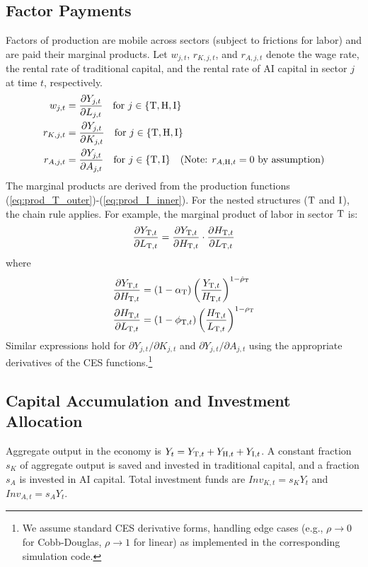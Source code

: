 \documentclass{article}
\newcommand{\sector}[1]{\textnormal{#1}}
\begin{document}
\subsection{Factor Payments}
Factors of production are mobile across sectors (subject to frictions for labor) and are paid their marginal products. 
Let $w_{j,t}$, $r_{K,j,t}$, and $r_{A,j,t}$ denote the wage rate, the rental rate of traditional capital, and the rental rate of AI capital in sector $j$ at time $t$, respectively.
\begin{align}
w_{j,t} &= \frac{\partial Y_{j,t}}{\partial L_{j,t}} \quad \text{for } j \in \{\sector{T}, \sector{H}, \sector{I}\} \label{eq:wage} \\
r_{K,j,t} &= \frac{\partial Y_{j,t}}{\partial K_{j,t}} \quad \text{for } j \in \{\sector{T}, \sector{H}, \sector{I}\} \label{eq:rental_K} \\
r_{A,j,t} &= \frac{\partial Y_{j,t}}{\partial A_{j,t}} \quad \text{for } j \in \{\sector{T}, \sector{I}\} \quad (\text{Note: } r_{A,\sector{H},t} = 0 \text{ by assumption}) \label{eq:rental_A}
\end{align}
The marginal products are derived from the production functions (\ref{eq:prod_T_outer})-(\ref{eq:prod_I_inner}). 
For the nested structures ($\sector{T}$ and $\sector{I}$), the chain rule applies. 
For example, the marginal product of labor in sector $\sector{T}$ is:
\begin{equation}
\frac{\partial Y_{\sector{T},t}}{\partial L_{\sector{T},t}} = \frac{\partial Y_{\sector{T},t}}{\partial H_{\sector{T},t}} \cdot \frac{\partial H_{\sector{T},t}}{\partial L_{\sector{T},t}}
\end{equation}
where
\begin{align}
\frac{\partial Y_{\sector{T},t}}{\partial H_{\sector{T},t}} &= (1-\alpha_{\sector{T}}) \left( \frac{Y_{\sector{T},t}}{H_{\sector{T},t}} \right)^{1-\hat{\rho}_{\sector{T}}} \\
\frac{\partial H_{\sector{T},t}}{\partial L_{\sector{T},t}} &= (1-\phi_{\sector{T},t}) \left( \frac{H_{\sector{T},t}}{L_{\sector{T},t}} \right)^{1-\rho_{\sector{T}}}
\end{align}
Similar expressions hold for $\partial Y_{j,t}/\partial K_{j,t}$ and $\partial Y_{j,t}/\partial A_{j,t}$ using the appropriate derivatives of the CES functions.\footnote{We assume standard CES derivative forms, handling edge cases (e.g., $\rho \to 0$ for Cobb-Douglas, $\rho \to 1$ for linear) as implemented in the corresponding simulation code.}

\subsection{Capital Accumulation and Investment Allocation}
Aggregate output in the economy is $Y_t = Y_{\sector{T},t} + Y_{\sector{H},t} + Y_{\sector{I},t}$. 
A constant fraction $s_K$ of aggregate output is saved and invested in traditional capital, and a fraction $s_A$ is invested in AI capital. 
Total investment funds are $Inv_{K,t} = s_K Y_t$ and $Inv_{A,t} = s_A Y_t$.
\end{document}
